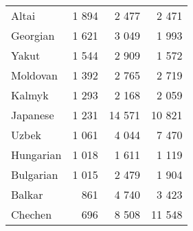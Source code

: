\begin{table}[!h]
\begin{tabular}{lrrr}
Altai & 1 894 & 2 477 & 2 471\\
Georgian & 1 621 & 3 049 & 1 993\\
Yakut & 1 544 & 2 909 & 1 572\\
Moldovan & 1 392 & 2 765 & 2 719\\
Kalmyk & 1 293 & 2 168 & 2 059\\
Japanese & 1 231 & 14 571 & 10 821\\
Uzbek & 1 061 & 4 044 & 7 470\\
Hungarian & 1 018 & 1 611 & 1 119\\
Bulgarian & 1 015 & 2 479 & 1 904\\
Balkar & 861 & 4 740 & 3 423\\
Chechen & 696 & 8 508 & 11 548\\
\bottomrule
\end{tabular}
\end{table}